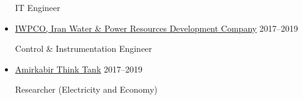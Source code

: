 \documentclass[11pt,a4paper,sans]{moderncv} %
\begin{document}
\begin{itemize}
        IT Engineer

          
        
        \vspace{1em}
		\item \href{https://www.linkedin.com/company/iwpco-iran-water-&-power-resources-development-company/}{
        IWPCO, Iran Water \& Power Resources Development Company} \hfill 2017--2019

        Control \& Instrumentation Engineer 
        
        \vspace{1em}
		\item \href{}{
        Amirkabir Think Tank} \hfill 2017--2019

        Researcher (Electricity and Economy)




        
		\end{itemize}
	
\end{document}
